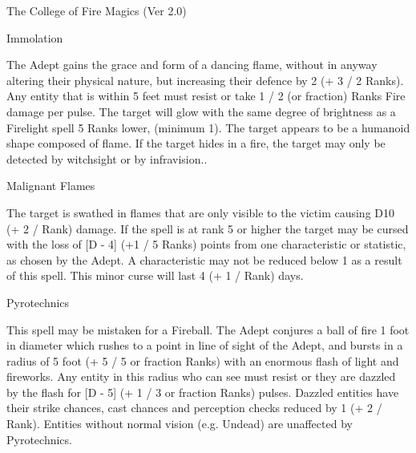 \begin{Chapter}{The College of Fire Magics (Ver 2.0)}
\begin{spell}[S-7]{Immolation}

\begin{effects}
The Adept gains the grace and form of a dancing flame, without in
anyway altering their physical nature, but increasing their defence by
2 (+ 3 / 2 Ranks).  Any entity that is within 5 feet must resist or
take 1 / 2 (or fraction) Ranks Fire damage per pulse.  The target will
glow with the same degree of brightness as a Firelight spell 5 Ranks
lower, (minimum 1).  The target appears to be a humanoid shape
composed of flame.  If the target hides in a fire, the target may only
be detected by witchsight or by infravision..
\end{effects}
\end{spell}

\begin{spell}[S-8]{Malignant Flames}

\begin{effects}
The target is swathed in flames that are only visible to the victim
causing D10 (+ 2 / Rank) damage. If the spell is at rank 5 or higher
the target may be cursed with the loss of [D - 4] (+1 / 5 Ranks)
points from one characteristic or statistic, as chosen by the Adept.
A characteristic may not be reduced below 1 as a result of this spell.
This minor curse will last 4 (+ 1 / Rank) days.
\end{effects}
\end{spell}

\begin{spell}[S-9]{Pyrotechnics}

\begin{effects}
This spell may be mistaken for a Fireball.  The Adept conjures a ball
of fire 1 foot in diameter which rushes to a point in line of sight of
the Adept, and bursts in a radius of 5 foot (+ 5 / 5 or fraction
Ranks) with an enormous flash of light and fireworks.  Any entity in
this radius who can see must resist or they are dazzled by the flash
for [D - 5] (+ 1 / 3 or fraction Ranks) pulses. Dazzled entities have
their strike chances, cast chances and perception checks reduced by 1
(+ 2 / Rank). Entities without normal vision (e.g.  Undead) are
unaffected by Pyrotechnics.
\end{effects}
\end{spell}


\end{Chapter}
